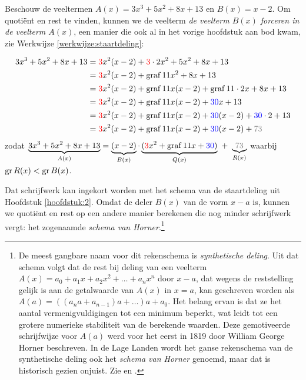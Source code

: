 \documentclass{ximera}
\begin{document}
\begin{algorithm} 
Beschouw de veeltermen $A(x) = 3x^3+5x^2+8x+13$ en $B(x) = x-2$. Om quotiënt en rest te vinden, kunnen we de veelterm 
\textit{ de veelterm $B(x)$ forceren in de veelterm $A(x)$}, een manier die ook al in het vorige hoofdstuk aan bod kwam, zie Werkwijze \ref{werkwijze:staartdeling}:


\begin{align*}
3x^3+5x^2+8x+13
& = {\red{3}}x^2(x-2) + {\red{3}}\cdot 2x^2 + 5x^2 + 8x + 13 \\
& = {\red{3}}x^2(x-2) + {\graf{11}}x^2 + 8x + 13 \\
& = {\red{3}}x^2(x-2) + {\graf{11}}x(x-2) + {\graf{11}}\cdot 2x + 8x + 13 \\
& = {\red{3}}x^2(x-2) + {\graf{11}}x(x-2) + {\blue{30}}x + 13 \\
& = {\red{3}}x^2(x-2) + {\graf{11}}x(x-2) + {\blue{30}}(x-2) + {\blue{30}} \cdot 2 + 13 \\
& = {\red{3}}x^2(x-2) + {\graf{11}}x(x-2) + {\blue{30}}(x-2) + {\gray{73}} %
\end{align*}
zodat $\D \underbrace{3x^3+5x^2+8x+13}_{A(x)} = \underbrace{(x-2)}_{B(x)}\cdot\underbrace{({\red{3}}x^2 + {\graf{11}}x + {\blue{30}})}_{Q(x)} \,\, + \,\, \underbrace{{\gray{73}}}_{R(x)}$ waarbij $\operatorname{gr} R(x) < \operatorname{gr} B(x)$.

Dat schrijfwerk kan ingekort worden met het schema van de staartdeling uit Hoofdstuk \ref{hoofdstuk:2}. Omdat de deler $B(x)$ van de vorm $x-a$ is, kunnen we quotiënt en rest op een andere manier berekenen die nog minder schrijfwerk vergt: het zogenaamde \textit{ schema van Horner}.\footnote{De meest gangbare naam voor dit rekenschema is \textit{ synthetische deling}. Uit dat schema volgt dat de rest bij deling van een veelterm $A(x) = a_0 + a_1x + a_2x^2 + \dots + a_nx^n$ door $x-a$, dat wegens de reststelling gelijk is aan de getalwaarde van $A(x)$ in $x=a$, kan geschreven worden als $A(a) = ((a_n a +a_{n-1})a+\dots)a+a_0$. Het belang ervan is dat ze het aantal vermenigvuldigingen tot een minimum beperkt, wat leidt tot een grotere numerieke stabiliteit van de berekende waarden. Deze gemotiveerde schrijfwijze voor $A(a)$ werd voor het eerst in 1819 door William George Horner beschreven. In de Lage Landen wordt het ganse rekenschema van de synthetische deling ook het \textit{ schema van Horner} genoemd, maar dat is historisch gezien onjuist. Zie \cite{Cajori} en \cite{wiki:Hornerschema}.} 
\renewcommand{\kolbreed}{\widthof{$2 \cdot 30$}}

\end{algorithm} 
\end{document}
